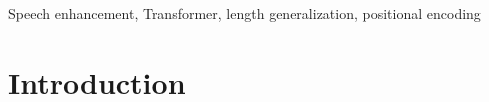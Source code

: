 \documentclass[journal]{IEEEtran}
\newcommand{\qian}[1]{{\color{magenta}#1}}
\begin{document}
\begin{abstract}

\end{abstract}

\begin{IEEEkeywords}
Speech enhancement, Transformer, length generalization, positional encoding
\end{IEEEkeywords}






%
\IEEEpeerreviewmaketitle



\section{Introduction}\label{sec:1}
%
%
%
%

\end{document}
